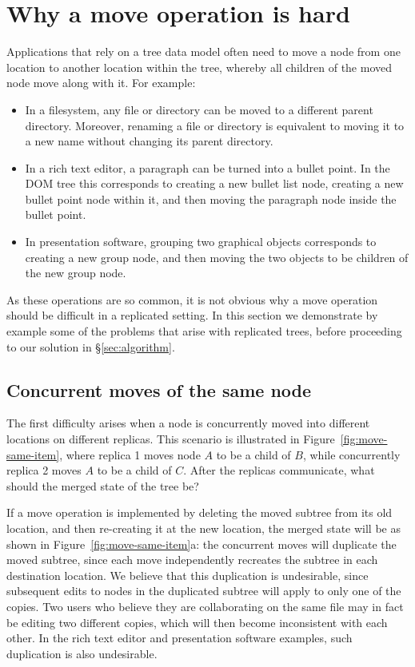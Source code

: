 \documentclass[sigplan,anonymous]{acmart}
\begin{document}
\section{Why a move operation is hard}\label{sec:move-is-hard}

Applications that rely on a tree data model often need to move a node from one location to another location within the tree, whereby all children of the moved node move along with it.
For example:
\begin{itemize}
    \item In a filesystem, any file or directory can be moved to a different parent directory.
        Moreover, renaming a file or directory is equivalent to moving it to a new name without changing its parent directory.
    \item In a rich text editor, a paragraph can be turned into a bullet point.
        In the DOM tree this corresponds to creating a new bullet list node, creating a new bullet point node within it, and then moving the paragraph node inside the bullet point.
    \item In presentation software, grouping two graphical objects corresponds to creating a new group node, and then moving the two objects to be children of the new group node.
\end{itemize}
As these operations are so common, it is not obvious why a move operation should be difficult in a replicated setting.
In this section we demonstrate by example some of the problems that arise with replicated trees, before proceeding to our solution in \S\ref{sec:algorithm}.

\subsection{Concurrent moves of the same node}\label{sec:move-same-item}

The first difficulty arises when a node is concurrently moved into different locations on different replicas.
This scenario is illustrated in Figure~\ref{fig:move-same-item}, where replica 1 moves node $A$ to be a child of $B$, while concurrently replica 2 moves $A$ to be a child of $C$.
After the replicas communicate, what should the merged state of the tree be?

If a move operation is implemented by deleting the moved subtree from its old location, and then re-creating it at the new location, the merged state will be as shown in Figure~\ref{fig:move-same-item}a: the concurrent moves will duplicate the moved subtree, since each move independently recreates the subtree in each destination location.
We believe that this duplication is undesirable, since subsequent edits to nodes in the duplicated subtree will apply to only one of the copies.
Two users who believe they are collaborating on the same file may in fact be editing two different copies, which will then become inconsistent with each other.
In the rich text editor and presentation software examples, such duplication is also undesirable.
\end{document}
